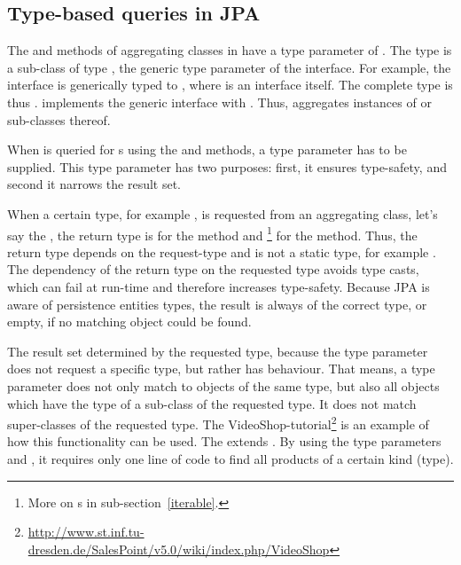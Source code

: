 \subsection{Type-based queries in JPA}
\label{jpa-types}
The  and  methods of aggregating classes in \salespoint{} have a type parameter of .
The type  is a sub-class of type , the generic type parameter of the interface.
For example, the  interface is generically typed to , where  is an interface itself.
The complete type is thus .
 implements the generic  interface with .
Thus,  aggregates instances of  or sub-classes thereof.

When  is queried for s using the  and  methods, a type parameter has to be supplied.
This type parameter has two purposes: first, it ensures type-safety, and second it narrows the result set.

When a certain type, for example , is requested from an aggregating class, let's say the , the return type is  for the  method and \footnote{More on s in sub-section~\ref{iterable}.} for the  method.
Thus, the return type depends on the request-type and is not a static type, for example .
The dependency of the return type on the requested type avoids type casts, which can fail at run-time and therefore increases type-safety.
Because JPA is aware of persistence entities types, the result is always of the correct type, or empty, if no matching object could be found.

The result set determined by the requested type, because the type parameter does not request a specific type, but rather has  behaviour.
That means, a type parameter does not only match to objects of the same type, but also all objects which have the type of a sub-class of the requested type.
It does not match super-classes of the requested type.
The VideoShop-tutorial\footnote{\url{http://www.st.inf.tu-dresden.de/SalesPoint/v5.0/wiki/index.php/VideoShop}} is an example of how this functionality can be used.
The  extends .
By using the type parameters  and , it requires only one line of code to find all products of a certain kind (type).


